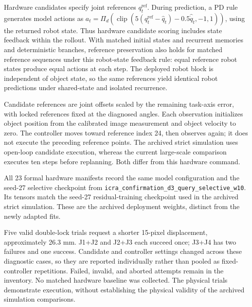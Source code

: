 \documentclass[conference]{IEEEtran}
\begin{document}
Hardware candidates specify joint references $q^{\mathrm{ref}}_t$. During prediction, a PD rule generates model actions as $a_t=\Pi_d(\operatorname{clip}(5(q^{\mathrm{ref}}_t-\hat q_t)-0.5\hat{\dot q}_t,-1,1))$, using the returned robot state. Thus hardware candidate scoring includes state feedback within the rollout. With matched initial states and recurrent memories and deterministic branches, reference preservation also holds for matched reference sequences under this robot-state feedback rule: equal reference robot states produce equal actions at each step. The deployed robot block is independent of object state, so the same references yield identical robot predictions under shared-state and isolated recurrence.

Candidate references are joint offsets scaled by the remaining task-axis error, with locked references fixed at the diagnosed angles. Each observation initializes object position from the calibrated image measurement and object velocity to zero. The controller moves toward reference index 24, then observes again; it does not execute the preceding reference points. The archived strict simulation uses open-loop candidate execution, whereas the current large-scale comparison executes ten steps before replanning. Both differ from this hardware command.

All 23 formal hardware manifests record the same model configuration and the seed-27 selective checkpoint from \texttt{icra\_confirmation\_d3\_query\_selective\_w10}. Its tensors match the seed-27 residual-training checkpoint used in the archived strict simulation. These are the archived deployment weights, distinct from the newly adapted fits.

Five valid double-lock trials request a shorter 15-pixel displacement, approximately 26.3 mm. J1+J2 and J2+J3 each succeed once; J3+J4 has two failures and one success. Candidate and controller settings changed across these diagnostic cases, so they are reported individually rather than pooled as fixed-controller repetitions. Failed, invalid, and aborted attempts remain in the inventory. No matched hardware baseline was collected. The physical trials demonstrate execution, without establishing the physical validity of the archived simulation comparisons.
\end{document}
